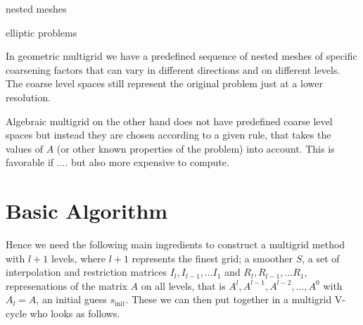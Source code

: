 \documentclass[../draft_1.tex]{subfiles}
\begin{document}
nested meshes

elliptic problems


In geometric multigrid we have a predefined sequence of nested meshes of specific coarsening factors that can vary in different directions and on different levels. The coarse level spaces still represent the original problem just at a lower resolution. 

Algebraic multigrid on the other hand does not have predefined coarse level spaces but instead they are chosen according to a given rule, that takes the values of $A$ (or other known properties of the problem) into account. This is favorable if .... but also more expensive to compute. 


\section{Basic Algorithm} 


Hence we need the following main ingredients to construct a multigrid method with $l+1$ levels, where $l+1$ represents the finest grid; a smoother $S$, a set of interpolation and restriction matrices $I_l, I_{l-1}, ...I_1$ and $R_l, R_{l-1}, ... R_1$, represenations of the matrix $A$ on all levels, that is $A^l, A^{l-1}, A^{l-2}, ..., A^0$ with $A_l = A$, an initial guess $s_{\text{init}}$. These we can then put together in a multigrid V-cycle who looks as follows. 
\end{document}
